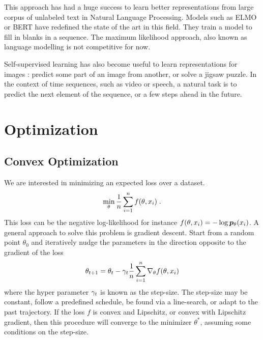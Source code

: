 This approach has had a huge success to learn better representations from large corpus of unlabeled text in Natural Language Processing. Models such as ELMO \citep{peters2018deep} or BERT \citep{devlin2018bert} have redefined the state of the art in this field. They train a model to fill in blanks in a sequence. The maximum likelihood approach, also known as language modelling is not competitive for now. 

Self-supervised learning has also become useful to learn representations for images : predict some part of an image from another, or solve a jigsaw puzzle. In the context of time sequences, such as video or speech, a natural task is to predict the next element of the sequence, or a few steps ahead in the future.



\section{Optimization}
\subsection{Convex Optimization}
\label{sec:optimization}
We are interested in minimizing an expected loss over a dataset. 
\begin{align}
    \min_\theta \frac{1}{n} \sum_{i=1}^n f(\theta, x_i) \; .
\end{align}
This loss can be the negative log-likelihood for instance $f(\theta, x_i) = - \log \bm{p}_{\theta}(x_i)$. A general approach to solve this problem is gradient descent. Start from a random point $\theta_0$ and iteratively nudge the parameters in the direction opposite to the gradient of the loss
\begin{align}
    \theta_{t+1} = \theta_t - \gamma_t \frac{1}{n} \sum_{i=1}^n \nabla_\theta f(\theta, x_i)
\end{align}
where the hyper parameter $\gamma_t$ is known as the step-size. The step-size may be constant, follow a predefined schedule, be found via a line-search, or adapt to the past trajectory.
If the loss  $f$ is convex and Lipschitz, or convex with Lipschitz gradient, then this procedure will converge to the minimizer $\theta^*$, assuming some conditions on the step-size.

